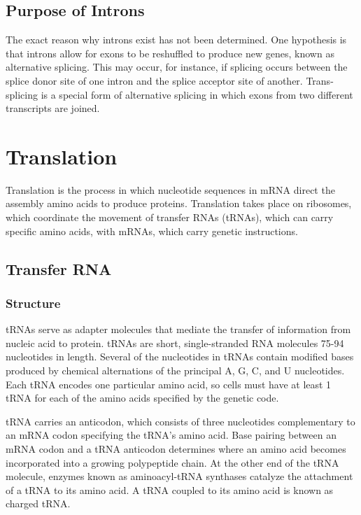 \documentclass[12pt,titlepage]{article}
\begin{document}
    \subsection{Purpose of Introns}
      The exact reason why introns exist has not been determined. One hypothesis is that introns allow for exons to be reshuffled to produce new genes,
      known as alternative splicing. This may occur, for instance, if splicing occurs between the splice donor site of one intron and the splice acceptor
      site of another. Trans-splicing is a special form of alternative splicing in which exons from two different transcripts are joined.

  \newpage

  \section{Translation}
    Translation is the process in which nucleotide sequences in mRNA direct the assembly amino acids to produce proteins. Translation takes place on ribosomes,
    which coordinate the movement of transfer RNAs (tRNAs), which can carry specific amino acids, with mRNAs, which carry genetic instructions.

    \subsection{Transfer RNA}

      \subsubsection{Structure}
        tRNAs serve as adapter molecules that mediate the transfer of information from nucleic acid to protein. tRNAs are short, single-stranded RNA molecules
        75-94 nucleotides in length. Several of the nucleotides in tRNAs contain modified bases produced by chemical alternations of the principal A, G, C, and U
        nucleotides. Each tRNA encodes one particular amino acid, so cells must have at least 1 tRNA for each of the amino acids specified by the genetic code.

        tRNA carries an anticodon, which consists of three nucleotides complementary to an mRNA codon specifying the tRNA's amino acid. Base pairing between
        an mRNA codon and a tRNA anticodon determines where an amino acid becomes incorporated into a growing polypeptide chain. At the other end of the tRNA
        molecule, enzymes known as aminoacyl-tRNA synthases catalyze the attachment of a tRNA to its amino acid. A tRNA coupled to its amino acid is known
        as charged tRNA.
\end{document}
